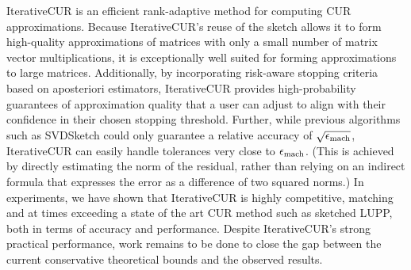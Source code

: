 IterativeCUR is an efficient rank-adaptive method for computing CUR approximations. Because IterativeCUR's reuse of the sketch allows it to form high-quality approximations of matrices with only a small number of matrix vector multiplications, it is exceptionally well suited for forming approximations to large matrices. Additionally, by incorporating risk-aware stopping criteria based on aposteriori estimators, IterativeCUR provides high-probability guarantees of approximation quality that a user can adjust to align with their confidence in their chosen stopping threshold. Further, while previous algorithms such as SVDSketch could only guarantee a relative accuracy of $\sqrt{\epsilon_{\rm mach}}$, IterativeCUR can easily handle tolerances very close to $\epsilon_{\rm mach}$. (This is achieved by directly estimating the norm of the residual, rather than relying on an indirect formula that expresses the error as a difference of two squared norms.)
In experiments, we have shown that IterativeCUR is highly competitive, matching and at times exceeding a state of the art CUR method such as sketched LUPP, both in terms of accuracy and performance. Despite IterativeCUR's strong practical performance, work remains to be done to close the gap between the current conservative theoretical bounds and the observed results. 